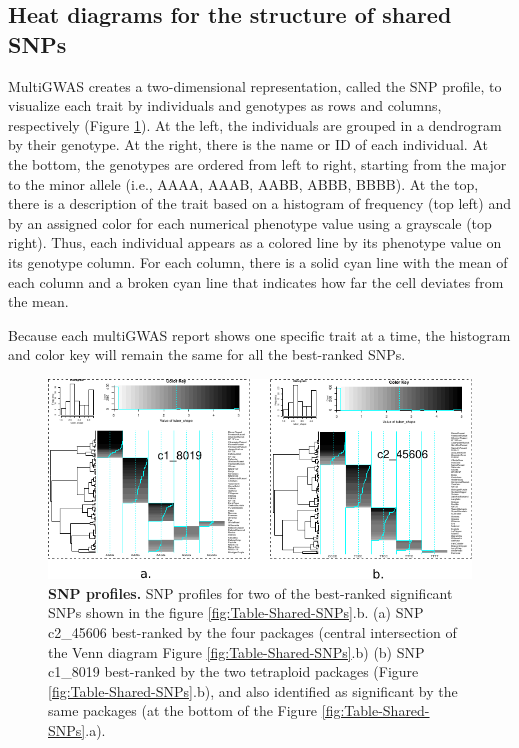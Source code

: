 \documentclass{article}
\begin{document}
\subsection{Heat diagrams for the structure of shared SNPs}

MultiGWAS creates a two-dimensional representation, called the SNP profile, to visualize each trait by individuals and genotypes as rows and columns, respectively (Figure \ref{fig:SNP-profiles}). At the left, the individuals are grouped in a dendrogram by their genotype. At the right, there
is the name or ID of each individual. At the bottom, the genotypes are ordered from left to right, starting from the major to the minor allele (i.e., AAAA, AAAB, AABB, ABBB, BBBB). At the top, there is a description of the trait based on a histogram of frequency (top left) and by an assigned color for each numerical phenotype value using a grayscale (top right). Thus, each individual appears as a
colored line by its phenotype value on its genotype column. For each column, there is a solid cyan line with the mean of each column and a broken cyan line that indicates how far the cell deviates from the
mean.

Because each multiGWAS report shows one specific trait at a time, the histogram and color key will remain the same for all the best-ranked
SNPs.

\begin{figure}[H]
\begin{centering}
\includegraphics{images/paper-heat-maps}
\par\end{centering}
\caption{\textbf{\scriptsize{}SNP profiles. }{\scriptsize{}SNP profiles for
two of the best-ranked significant SNPs shown in the figure \ref{fig:Table-Shared-SNPs}.b.
(a) SNP c2\_45606 best-ranked by the four packages (central intersection
of the Venn diagram Figure \ref{fig:Table-Shared-SNPs}.b) (b) SNP
c1\_8019 best-ranked by the two tetraploid packages (Figure \ref{fig:Table-Shared-SNPs}.b),
and also identified as significant by the same packages (at the bottom
of the Figure \ref{fig:Table-Shared-SNPs}.a). \label{fig:SNP-profiles}}}
\end{figure}
\end{document}
